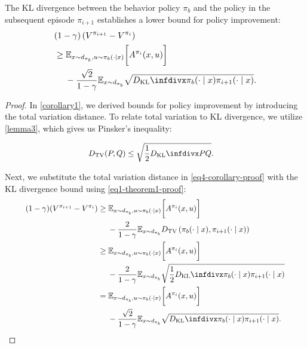 \begin{theorem}
\label{theorem1}
The KL divergence between the behavior policy $\pi_b$ and the policy in the subsequent episode $\pi_{i+1}$ establishes a lower bound for policy improvement:
\begin{equation} 
\label{eq-theorem1}
\resizebox{0.7\hsize}{!}{$
\begin{aligned}
& (1-\gamma)\left(V^{\pi_{i+1}}-V^{\pi_i}\right) \\
& \geq \mathbb{E}_{x \sim d_{\pi_b}, u \sim \pi_b(\cdot \mid x)} \bigg[ A^{\pi_i}(x, u) \bigg] \\
& \quad\; -\frac{\sqrt{2}}{1-\gamma} \mathbb{E}_{x \sim d_{\pi_b}} \sqrt{\infdiv{\pi_b(\cdot \mid x)}{\pi_{i+1}(\cdot \mid x)}}.
\end{aligned}
$}
\end{equation}
\end{theorem}

\begin{proof}
In \autoref{corollary1}, we derived bounds for policy improvement by introducing the total variation distance. To relate total variation to KL divergence, we utilize \autoref{lemma3}, which gives us Pinsker's inequality:

\begin{equation}
\label{eq1-theorem1-proof}
\resizebox{0.48\hsize}{!}{
\begin{math}
\begin{aligned}
    {D_{\mathrm{TV}}}(P, Q) & \leq \sqrt{\frac{1}{2} \infdiv{P}{Q}}.
\end{aligned}
\end{math}
}
\end{equation}

Next, we substitute the total variation distance in \autoref{eq4-corollary-proof} with the KL divergence bound using \autoref{eq1-theorem1-proof}:
\begin{equation}
\resizebox{0.9\hsize}{!}{$
\begin{aligned} 
\label{eq2-theorem1-proof}
(1-\gamma)(V^{\pi_{i+1}}-V^{{\pi_{i}}}) & \geq \mathbb{E}_{x \sim d_{\pi_b}, u \sim \pi_b(\cdot \mid x)} \bigg[ A^{\pi_i}(x, u) \bigg] \\
& \quad\; -\frac{2}{1-\gamma} \mathbb{E}_{x \sim d_{\pi_b}} D_{\mathrm{TV}}\left(\pi_b(\cdot \mid x), \pi_{i+1}(\cdot \mid x)\right) \\
& \geq \mathbb{E}_{x \sim d_{\pi_b}, u \sim \pi_b(\cdot \mid x)} \bigg[ A^{\pi_i}(x, u) \bigg] \\
& \quad\; -\frac{2}{1-\gamma} \mathbb{E}_{x \sim d_{\pi_b}} \sqrt{\frac{1}{2}\infdiv{\pi_b(\cdot \mid x)}{\pi_{i+1}(\cdot \mid x)}} \\
& = \mathbb{E}_{x \sim d_{\pi_b}, u \sim \pi_b(\cdot \mid x)} \bigg[ A^{\pi_i}(x, u) \bigg] \\
& \quad\; -\frac{\sqrt{2}}{1-\gamma} \mathbb{E}_{x \sim d_{\pi_b}} \sqrt{\infdiv{\pi_b(\cdot \mid x)}{\pi_{i+1}(\cdot \mid x)}}.
\end{aligned}
$}
\end{equation}
\end{proof}

